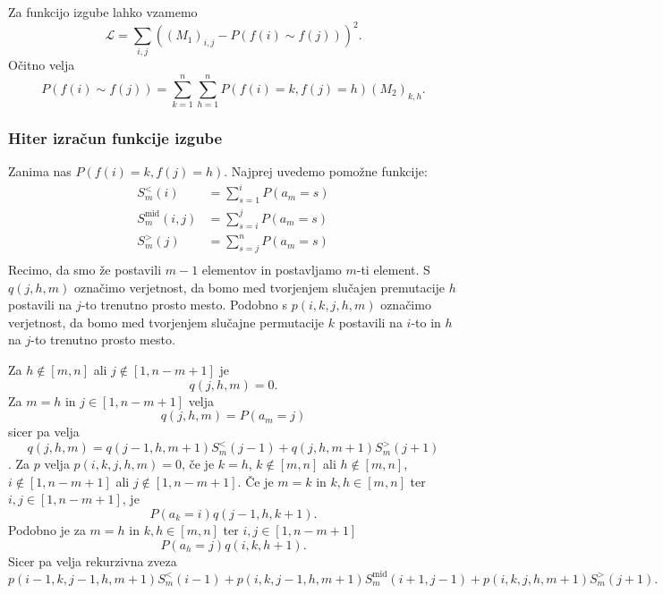 \documentclass[mat2, tisk]{fmfdelo}
\newcommand{\loss }{\mathcal L}
\begin{document}
            Za funkcijo izgube lahko vzamemo
            $$
            \loss = \sum_{i, j} ( (M_1)_{i,j} - P(f(i) \sim f(j)) )^2.
            $$
            Očitno velja
            $$
            P(f(i) \sim f(j)) = \sum_{k=1}^n \sum_{h=1}^n P(f(i) = k,
            f(j) = h) (M_2)_{k,h}.
            $$
            \subsubsection{Hiter izračun funkcije izgube}
            Zanima nas $P(f(i) = k, f(j) = h)$.
            Najprej uvedemo pomožne funkcije:
            \begin{align*}
              S_m^<(i) &= \sum_{s=1}^{i} P(a_m = s) \\
              S_m^\text{mid}(i,j) &= \sum_{s=i}^{j} P(a_m = s) \\
              S_m^>(j) &= \sum_{s=j}^{n} P(a_m = s) \\
            \end{align*}
            Recimo, da smo že postavili $m-1$ elementov
            in postavljamo $m$-ti element. S
            $q(j,h,m)$ označimo verjetnost, da bomo med
            tvorjenjem slučajen premutacije $h$ postavili na
            $j$-to trenutno prosto mesto. Podobno s $p(i, k, j, h, m)$ označimo verjetnost, da bomo
            med tvorjenjem slučajne permutacije $k$ postavili na
            $i$-to in $h$ na $j$-to trenutno prosto mesto.

            Za $h \notin [m, n]$ ali $j \notin [1, n-m+1]$ je
            $$q(j,h,m) = 0.$$
            Za $m=h$ in $j \in [1, n-m+1]$ velja
            $$q(j,h,m) = P(a_m = j)$$ sicer pa velja
            $$q(j, h, m) =   q(j-1, h, m+1) S_m^<(j-1) +
            q(j, h, m+1) S_m^>(j+1)$$.
            Za $p$ velja $p(i, k, j, h, m) = 0$, če je $k=h$,
            $k \notin [m, n]$ ali $h \notin [m, n]$, $i \notin [1,
            n-m+1]$ ali $j \notin [1, n-m+1]$.
            Če je $m=k$ in $k,h \in [m,n]$ ter $i,j \in [1, n-m+1]$,
            je 
            $$
            P(a_k = i) q(j-1, h, k+1).
            $$
            Podobno je za $m=h$ in $k,h \in [m,n]$ ter $i,j \in [1,
            n-m+1]$
            $$
            P(a_h = j) q(i, k, h+1).
            $$
            Sicer pa velja rekurzivna zveza
            $$
            p(i-1, k, j-1, h, m+1) S_m^<(i-1) +
              p(i, k, j-1, h, m+1) S_m^{\text{mid}}(i+1, j-1) +
              p(i, k, j, h, m+1) S_m^>(j+1).
            $$
            
\end{document}
